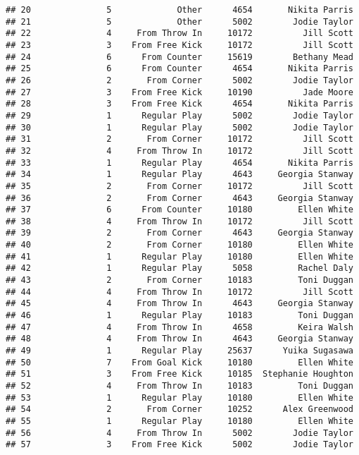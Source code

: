 \documentclass[]{article}
\begin{document}
\begin{verbatim}
## 20               5             Other      4654       Nikita Parris
## 21               5             Other      5002        Jodie Taylor
## 22               4     From Throw In     10172          Jill Scott
## 23               3    From Free Kick     10172          Jill Scott
## 24               6      From Counter     15619        Bethany Mead
## 25               6      From Counter      4654       Nikita Parris
## 26               2       From Corner      5002        Jodie Taylor
## 27               3    From Free Kick     10190          Jade Moore
## 28               3    From Free Kick      4654       Nikita Parris
## 29               1      Regular Play      5002        Jodie Taylor
## 30               1      Regular Play      5002        Jodie Taylor
## 31               2       From Corner     10172          Jill Scott
## 32               4     From Throw In     10172          Jill Scott
## 33               1      Regular Play      4654       Nikita Parris
## 34               1      Regular Play      4643     Georgia Stanway
## 35               2       From Corner     10172          Jill Scott
## 36               2       From Corner      4643     Georgia Stanway
## 37               6      From Counter     10180         Ellen White
## 38               4     From Throw In     10172          Jill Scott
## 39               2       From Corner      4643     Georgia Stanway
## 40               2       From Corner     10180         Ellen White
## 41               1      Regular Play     10180         Ellen White
## 42               1      Regular Play      5058         Rachel Daly
## 43               2       From Corner     10183         Toni Duggan
## 44               4     From Throw In     10172          Jill Scott
## 45               4     From Throw In      4643     Georgia Stanway
## 46               1      Regular Play     10183         Toni Duggan
## 47               4     From Throw In      4658         Keira Walsh
## 48               4     From Throw In      4643     Georgia Stanway
## 49               1      Regular Play     25637      Yuika Sugasawa
## 50               7    From Goal Kick     10180         Ellen White
## 51               3    From Free Kick     10185  Stephanie Houghton
## 52               4     From Throw In     10183         Toni Duggan
## 53               1      Regular Play     10180         Ellen White
## 54               2       From Corner     10252      Alex Greenwood
## 55               1      Regular Play     10180         Ellen White
## 56               4     From Throw In      5002        Jodie Taylor
## 57               3    From Free Kick      5002        Jodie Taylor

\end{verbatim}
\end{document}
